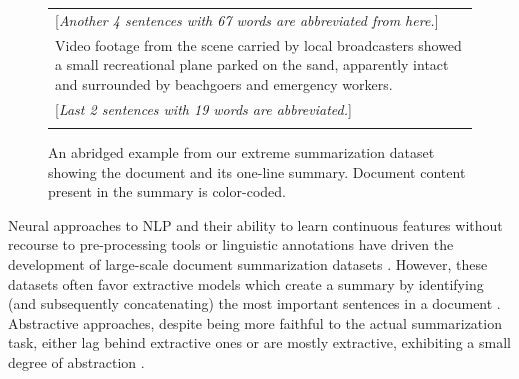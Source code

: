 \begin{figure}[t!]
{\begin{tabular}{ p{7.2cm} }
      [{\em Another 4 sentences with 67 words are abbreviated from here.}] \\



      Video footage from the scene carried by local broadcasters showed \textcolor{sepia}{a small recreational plane} parked on the sand, apparently intact and surrounded by beachgoers and emergency workers. %
      \\

        
      [{\em Last 2 sentences with 19 words are abbreviated.}] \\
      
      \thickhline
    \end{tabular}     
  }
  \caption{An abridged example from our extreme summarization dataset
    showing the document and its one-line summary. Document content
    present in the summary is color-coded.
  }\label{fig:bbcex-1}
\end{figure}

Neural approaches to NLP and their ability to learn continuous
features without recourse to pre-processing tools or linguistic
annotations have driven the development of large-scale document
summarization datasets
\cite{nytcorpus,hermann-nips15,newsroom-naacl18}.
However, these datasets often favor extractive models which create a
summary by identifying (and subsequently concatenating) the most
important sentences in a document
\cite{jp-acl16,nallapati17,narayan-rank18}.  Abstractive approaches,
despite being more faithful to the actual summarization task, either
lag behind extractive ones or are mostly extractive, exhibiting a
small degree of abstraction
\cite{see-acl17,tanwan-acl17,paulus-socher-arxiv17,Pasunuru-multireward18,asli-multiagent18}.


